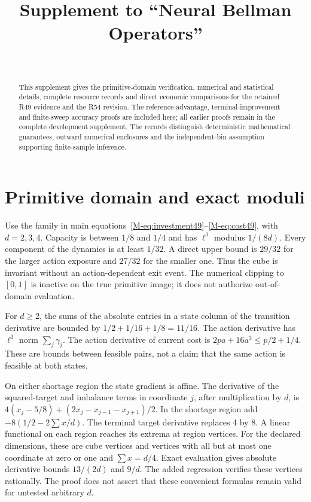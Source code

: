 \documentclass[ecta,nameyear,draft]{econsocart}
\begin{document}
\begin{frontmatter}
\title{Supplement to ``Neural Bellman Operators''}
\begin{aug}\author[id=au1,addressref={add1}]{~}\address[id=add1]{Peking University}\end{aug}
\begin{abstract}
This supplement gives the primitive-domain verification, numerical and statistical details, complete resource records and direct economic comparisons for the retained R49 evidence and the R54 revision. The reference-advantage, terminal-improvement and finite-sweep accuracy proofs are included here; all earlier proofs remain in the complete development supplement. The records distinguish deterministic mathematical guarantees, outward numerical enclosures and the independent-bin assumption supporting finite-sample inference.
\end{abstract}\end{frontmatter}
\section{Primitive domain and exact moduli}\label{supp:primitive49}
Use the family in main equations~\eqref{M-eq:investment49}--\eqref{M-eq:cost49}, with $d=2,3,4$. Capacity is between $1/8$ and $1/4$ and has $\ell^1$ modulus $1/(8d)$. Every component of the dynamics is at least $1/32$. A direct upper bound is $29/32$ for the larger action exposure and $27/32$ for the smaller one. Thus the cube is invariant without an action-dependent exit event. The numerical clipping to $[0,1]$ is inactive on the true primitive image; it does not authorize out-of-domain evaluation.

For $d\ge2$, the sums of the absolute entries in a state column of the transition derivative are bounded by $1/2+1/16+1/8=11/16$. The action derivative has $\ell^1$ norm $\sum_j\gamma_j$. The action derivative of current cost is $2pa+16a^3\le p/2+1/4$. These are bounds between feasible pairs, not a claim that the same action is feasible at both states.

On either shortage region the state gradient is affine. The derivative of the squared-target and imbalance terms in coordinate $j$, after multiplication by $d$, is $4(x_j-5/8)+(2x_j-x_{j-1}-x_{j+1})/2$. In the shortage region add $-8(1/2-2\sum x/d)$. The terminal target derivative replaces 4 by 8. A linear functional on each region reaches its extrema at region vertices. For the declared dimensions, these are cube vertices and vertices with all but at most one coordinate at zero or one and $\sum x=d/4$. Exact evaluation gives absolute derivative bounds $13/(2d)$ and $9/d$. The added regression verifies these vertices rationally. The proof does not assert that these convenient formulas remain valid for untested arbitrary $d$.
\end{document}
